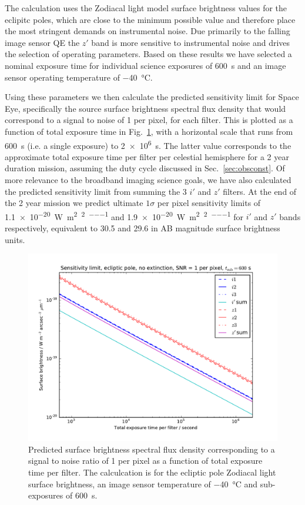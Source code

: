 \documentclass[]{iac}
\begin{document}
The calculation uses the Zodiacal light model surface brightness values for the eclipitc poles, which are close to the
minimum possible value and therefore place the most stringent demands on instrumental noise. Due primarily to the
falling image sensor QE the $z'$ band is more sensitive to instrumental noise and drives the selection of operating
parameters. Based on these results we have selected a nominal exposure time for individual science exposures of
\SI{600}{\second} and an image sensor operating temperature of \SI{-40}{\celsius}.

Using these parameters we then calculate the predicted sensitivity limit for Space Eye, specifically the source surface
brightness spectral flux density that would correspond to a signal to noise of 1 per pixel, for each filter. This is
plotted as a function of total exposure time in Fig.~\ref{fig:sens}, with a horizontal scale that runs from
\SI{600}{\second} (i.e. a single exposure) to \SI{2e6}{\second}. The latter value corresponds to the approximate total
exposure time per filter per celestial hemisphere for a 2 year duration mission, assuming the duty cycle discussed in
Sec.~\ref{sec:obsconst}. Of more relevance to the broadband imaging science goals, we have also calculated the predicted
sensitivity limit from summing the 3 $i'$ and $z'$ filters. At the end of the 2 year mission we predict ultimate
$1\sigma$ per pixel sensitivity limits of \SI{1.1e-20}{\watt\per\metre\squared\per\tarcsecond\squared\per\micron} and
\SI{1.9e-20}{\watt\per\metre\squared\per\tarcsecond\squared\per\micron} for $i'$ and $z'$ bands respectively, equivalent
to 30.5 and 29.6 in AB magnitude surface brightness units.

\begin{figure}[htp]
  \center \includegraphics[width=\columnwidth]{figures/sens.pdf}
  \caption{\label{fig:sens}Predicted surface brightness spectral flux density corresponding to a signal to noise ratio
    of 1 per pixel as a function of total exposure time per filter. The calculcation is for the ecliptic pole Zodiacal
    light surface brightness, an image sensor temperature of \SI{-40}{\celsius} and sub-exposures of \SI{600}{\second}.}
\end{figure}
\end{document}
